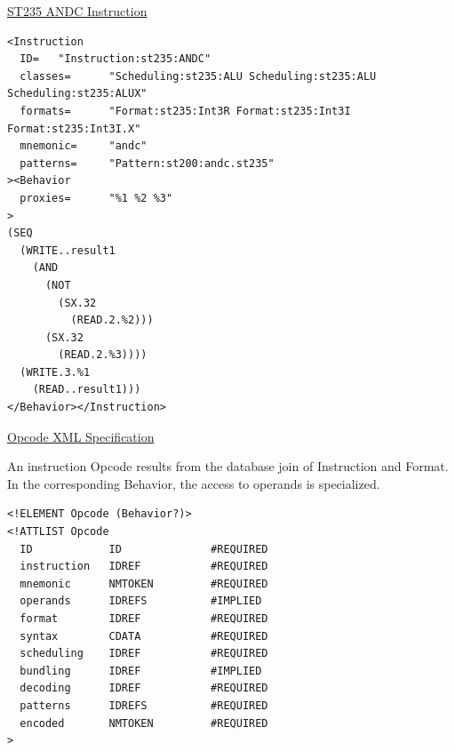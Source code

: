 \documentclass[a4]{seminar}
\begin{document}
\begin{slide}

\begin{center} \underline{ST235 ANDC Instruction} \end{center}

{\scriptsize
\begin{verbatim}
<Instruction
  ID=   "Instruction:st235:ANDC"
  classes=      "Scheduling:st235:ALU Scheduling:st235:ALU Scheduling:st235:ALUX"
  formats=      "Format:st235:Int3R Format:st235:Int3I Format:st235:Int3I.X"
  mnemonic=     "andc"
  patterns=     "Pattern:st200:andc.st235"
><Behavior
  proxies=      "%1 %2 %3"
>
(SEQ
  (WRITE..result1
    (AND
      (NOT
        (SX.32
          (READ.2.%2)))
      (SX.32
        (READ.2.%3))))
  (WRITE.3.%1
    (READ..result1)))
</Behavior></Instruction>
\end{verbatim}
}

\end{slide}


\begin{slide}

\begin{center} \underline{Opcode XML Specification} \end{center}

An instruction Opcode results from the database join of Instruction and
Format. In the corresponding Behavior, the access to operands is specialized.

{\scriptsize
\begin{verbatim}
<!ELEMENT Opcode (Behavior?)>
<!ATTLIST Opcode
  ID            ID              #REQUIRED
  instruction   IDREF           #REQUIRED
  mnemonic      NMTOKEN         #REQUIRED
  operands      IDREFS          #IMPLIED
  format        IDREF           #REQUIRED
  syntax        CDATA           #REQUIRED
  scheduling    IDREF           #REQUIRED
  bundling      IDREF           #IMPLIED
  decoding      IDREF           #REQUIRED
  patterns      IDREFS          #REQUIRED
  encoded       NMTOKEN         #REQUIRED
>
\end{verbatim}
}

\end{slide}
\end{document}
